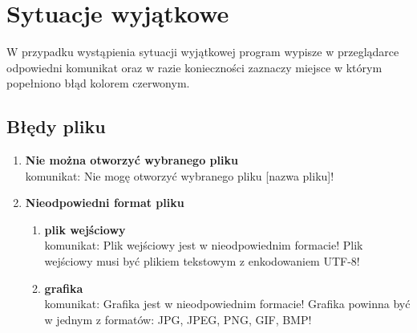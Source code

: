 \documentclass[hidelinks,10pt,a4paper]{article}
\newcommand\tab[1][0.5cm]{\hspace*{#1}}
\begin{document}
\section{Sytuacje wyjątkowe}
\tab W przypadku wystąpienia sytuacji wyjątkowej program wypisze w przeglądarce odpowiedni komunikat oraz w razie konieczności zaznaczy miejsce w którym popełniono błąd kolorem czerwonym.

\subsection{Błędy pliku}
\begin{enumerate}


\item{\textbf{Nie można otworzyć wybranego pliku}}
\\komunikat: Nie mogę otworzyć wybranego pliku [nazwa pliku]!  
\item \textbf{Nieodpowiedni format pliku}
\begin{enumerate}
\item \textbf{plik wejściowy}
\\ komunikat: Plik wejściowy jest w nieodpowiednim formacie! Plik wejściowy musi być plikiem tekstowym z enkodowaniem UTF-8! 
\item \textbf{grafika}
\\ komunikat: Grafika jest w nieodpowiednim formacie! Grafika powinna być w jednym z formatów: JPG, JPEG, PNG, GIF, BMP! 
\end{enumerate}
\end{enumerate}
\end{document}

